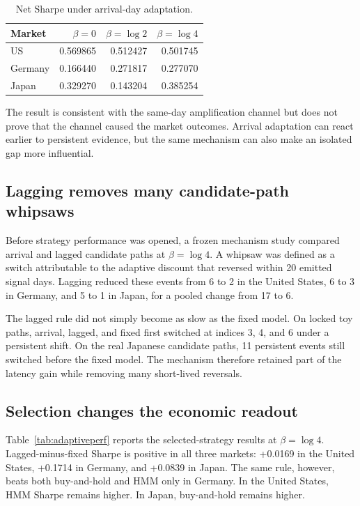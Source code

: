 \documentclass[11pt]{article}
\begin{document}
\begin{table}[H]
\centering
\caption{Net Sharpe under arrival-day adaptation.}
\label{tab:arrival}
\begin{tabular}{lrrr}
\toprule
Market & $\beta=0$ & $\beta=\log 2$ & $\beta=\log 4$ \\
\midrule
US & 0.569865 & 0.512427 & 0.501745 \\
Germany & 0.166440 & 0.271817 & 0.277070 \\
Japan & 0.329270 & 0.143204 & 0.385254 \\
\bottomrule
\end{tabular}
\end{table}

The result is consistent with the same-day amplification channel but does not prove that the channel caused the market outcomes. Arrival adaptation can react earlier to persistent evidence, but the same mechanism can also make an isolated gap more influential.

\subsection{Lagging removes many candidate-path whipsaws}

Before strategy performance was opened, a frozen mechanism study compared arrival and lagged candidate paths at $\beta=\log 4$. A whipsaw was defined as a switch attributable to the adaptive discount that reversed within 20 emitted signal days. Lagging reduced these events from 6 to 2 in the United States, 6 to 3 in Germany, and 5 to 1 in Japan, for a pooled change from 17 to 6.

The lagged rule did not simply become as slow as the fixed model. On locked toy paths, arrival, lagged, and fixed first switched at indices 3, 4, and 6 under a persistent shift. On the real Japanese candidate paths, 11 persistent events still switched before the fixed model. The mechanism therefore retained part of the latency gain while removing many short-lived reversals.

\subsection{Selection changes the economic readout}

Table~\ref{tab:adaptiveperf} reports the selected-strategy results at $\beta=\log 4$. Lagged-minus-fixed Sharpe is positive in all three markets: +0.0169 in the United States, +0.1714 in Germany, and +0.0839 in Japan. The same rule, however, beats both buy-and-hold and HMM only in Germany. In the United States, HMM Sharpe remains higher. In Japan, buy-and-hold remains higher.
\end{document}
